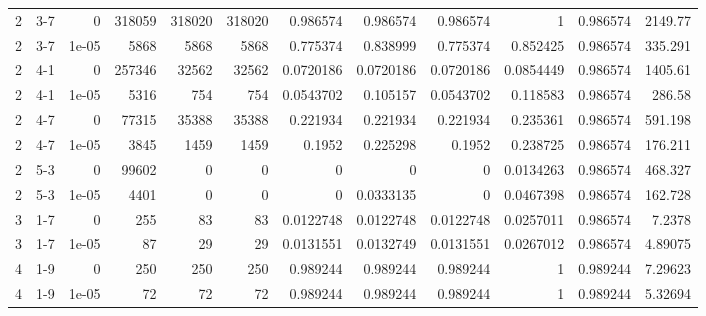 \begin{tabular}{rlrrrrrrrrrr}
     2 & 3-7    &      0     &      318059 &            318020 &            318020 &       0.986574  &       0.986574  &        0.986574  &        1         &               0.986574 &         2149.77    \\
     2 & 3-7    &      1e-05 &        5868 &              5868 &              5868 &       0.775374  &       0.838999  &        0.775374  &        0.852425  &               0.986574 &          335.291   \\
     2 & 4-1    &      0     &      257346 &             32562 &             32562 &       0.0720186 &       0.0720186 &        0.0720186 &        0.0854449 &               0.986574 &         1405.61    \\
     2 & 4-1    &      1e-05 &        5316 &               754 &               754 &       0.0543702 &       0.105157  &        0.0543702 &        0.118583  &               0.986574 &          286.58    \\
     2 & 4-7    &      0     &       77315 &             35388 &             35388 &       0.221934  &       0.221934  &        0.221934  &        0.235361  &               0.986574 &          591.198   \\
     2 & 4-7    &      1e-05 &        3845 &              1459 &              1459 &       0.1952    &       0.225298  &        0.1952    &        0.238725  &               0.986574 &          176.211   \\
     2 & 5-3    &      0     &       99602 &                 0 &                 0 &       0         &       0         &        0         &        0.0134263 &               0.986574 &          468.327   \\
     2 & 5-3    &      1e-05 &        4401 &                 0 &                 0 &       0         &       0.0333135 &        0         &        0.0467398 &               0.986574 &          162.728   \\
     3 & 1-7    &      0     &         255 &                83 &                83 &       0.0122748 &       0.0122748 &        0.0122748 &        0.0257011 &               0.986574 &            7.2378  \\
     3 & 1-7    &      1e-05 &          87 &                29 &                29 &       0.0131551 &       0.0132749 &        0.0131551 &        0.0267012 &               0.986574 &            4.89075 \\
     4 & 1-9    &      0     &         250 &               250 &               250 &       0.989244  &       0.989244  &        0.989244  &        1         &               0.989244 &            7.29623 \\
     4 & 1-9    &      1e-05 &          72 &                72 &                72 &       0.989244  &       0.989244  &        0.989244  &        1         &               0.989244 &            5.32694 \\
\hline
\end{tabular}

